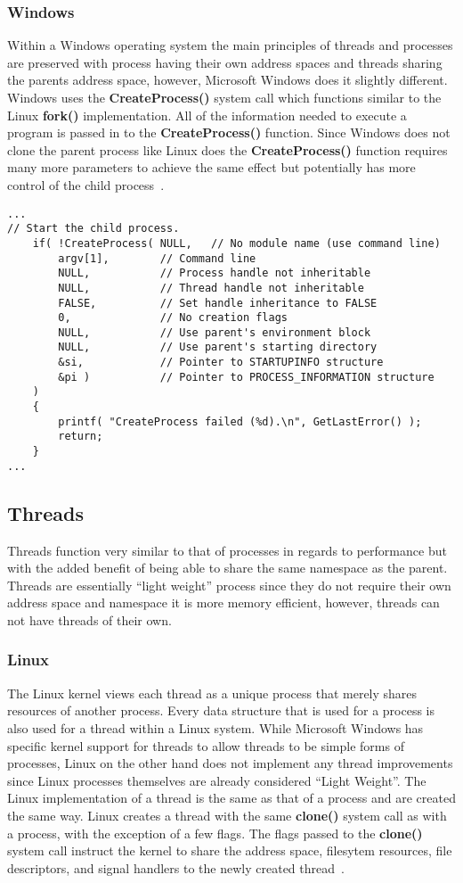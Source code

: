 \documentclass[letterpaper,10pt,notitlepage,fleqn]{article}
\begin{document}
\subsubsection*{Windows}
Within a Windows operating system the main principles of threads and processes 
are preserved with process having their own address spaces and threads sharing 
the parents address space, however, Microsoft Windows does it slightly different. 
Windows uses the \textbf{CreateProcess()} system call which functions similar to 
the Linux \textbf{fork()} implementation. All of the information needed to execute 
a program is passed in to the \textbf{CreateProcess()} function. Since Windows does 
not clone the parent process like Linux does the \textbf{CreateProcess()} function 
requires many more parameters to achieve the same effect but potentially has more 
control of the child process~\cite{WI16}. 
\begin{lstlisting}
...
// Start the child process. 
    if( !CreateProcess( NULL,   // No module name (use command line)
        argv[1],        // Command line
        NULL,           // Process handle not inheritable
        NULL,           // Thread handle not inheritable
        FALSE,          // Set handle inheritance to FALSE
        0,              // No creation flags
        NULL,           // Use parent's environment block
        NULL,           // Use parent's starting directory 
        &si,            // Pointer to STARTUPINFO structure
        &pi )           // Pointer to PROCESS_INFORMATION structure
    ) 
    {
        printf( "CreateProcess failed (%d).\n", GetLastError() );
        return;
    }
...
\end{lstlisting}
\subsection{Threads}
Threads function very similar to that of processes in regards to performance but 
with the added benefit of being able to share the same namespace as the parent. 
Threads are essentially ``light weight'' process since they do not require their 
own address space and namespace it is more memory efficient, however, threads can 
not have threads of their own. 
\subsubsection*{Linux}
The Linux kernel views each thread as a unique process that merely shares resources 
of another process. Every data structure that is used for a process is also used 
for a thread within a Linux system. While Microsoft Windows has specific kernel 
support for threads to allow threads to be simple forms of processes, Linux on the 
other hand does not implement any thread improvements since Linux processes themselves 
are already considered ``Light Weight''. 
The Linux implementation of a thread is the same as that of a process and are created 
the same way. Linux creates a thread with the same \textbf{clone()} system call 
as with a process, with the exception of a few flags. 
The flags passed to the \textbf{clone()} system call instruct the kernel to share 
the address space, filesytem resources, file descriptors, and signal handlers to 
the newly created thread~\cite{LKD3}. 
\end{document}
